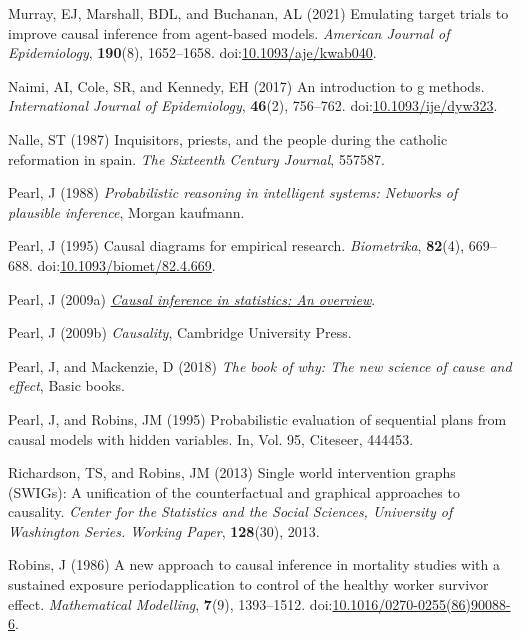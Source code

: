 \documentclass[
  singlecolumn,
  9pt]{article}
\newlength{\cslhangindent}
\newenvironment{CSLReferences}[2] %
 {\begin{list}{}{%
  \setlength{\itemindent}{0pt}
  \setlength{\leftmargin}{0pt}
  \setlength{\parsep}{0pt}
  \ifodd #1
   \setlength{\leftmargin}{\cslhangindent}
   \setlength{\itemindent}{-1\cslhangindent}
  \fi
  \setlength{\itemsep}{#2\baselineskip}}}
 {\end{list}}
\begin{document}
\begin{CSLReferences}{1}{0}
Murray, EJ, Marshall, BDL, and Buchanan, AL (2021) Emulating target
trials to improve causal inference from agent-based models.
\emph{American Journal of Epidemiology}, \textbf{190}(8), 1652--1658.
doi:\href{https://doi.org/10.1093/aje/kwab040}{10.1093/aje/kwab040}.

Naimi, AI, Cole, SR, and Kennedy, EH (2017) An introduction to g
methods. \emph{International Journal of Epidemiology}, \textbf{46}(2),
756--762.
doi:\href{https://doi.org/10.1093/ije/dyw323}{10.1093/ije/dyw323}.

Nalle, ST (1987) Inquisitors, priests, and the people during the
catholic reformation in spain. \emph{The Sixteenth Century Journal},
557587.

Pearl, J (1988) \emph{Probabilistic reasoning in intelligent systems:
Networks of plausible inference}, Morgan kaufmann.

Pearl, J (1995) Causal diagrams for empirical research.
\emph{Biometrika}, \textbf{82}(4), 669--688.
doi:\href{https://doi.org/10.1093/biomet/82.4.669}{10.1093/biomet/82.4.669}.

Pearl, J (2009a) \emph{\href{https://doi.org/10.1214/09-SS057}{Causal
inference in statistics: An overview}}.

Pearl, J (2009b) \emph{Causality}, Cambridge University Press.

Pearl, J, and Mackenzie, D (2018) \emph{The book of why: The new science
of cause and effect}, Basic books.

Pearl, J, and Robins, JM (1995) Probabilistic evaluation of sequential
plans from causal models with hidden variables. In, Vol. 95, Citeseer,
444453.

Richardson, TS, and Robins, JM (2013) Single world intervention graphs
(SWIGs): A unification of the counterfactual and graphical approaches to
causality. \emph{Center for the Statistics and the Social Sciences,
University of Washington Series. Working Paper}, \textbf{128}(30), 2013.

Robins, J (1986) A new approach to causal inference in mortality studies
with a sustained exposure period{\textemdash}application to control of
the healthy worker survivor effect. \emph{Mathematical Modelling},
\textbf{7}(9), 1393--1512.
doi:\href{https://doi.org/10.1016/0270-0255(86)90088-6}{10.1016/0270-0255(86)90088-6}.


\end{CSLReferences}
\end{document}
